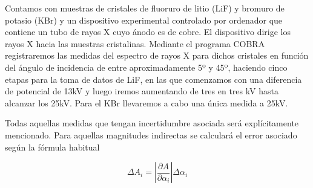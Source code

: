 Contamos con muestras de cristales de fluoruro de litio (LiF) y bromuro de potasio (KBr) y un dispositivo experimental controlado por ordenador que contiene un tubo de rayos X cuyo ánodo es de cobre. El dispositivo dirige los rayos X hacia las muestras cristalinas. Mediante el programa COBRA registraremos las medidas del espectro de rayos X para dichos cristales en función del ángulo de incidencia de entre aproximadamente 5º y 45º, haciendo cinco etapas para la toma de datos de LiF, en las que comenzamos con una diferencia de potencial de 13kV y luego iremos aumentando de tres en tres kV hasta alcanzar los 25kV. Para el KBr llevaremos a cabo una única medida a 25kV.

Todas aquellas medidas que tengan incertidumbre asociada será explícitamente mencionado. Para aquellas magnitudes indirectas se calculará el error asociado según la fórmula habitual

\begin{equation}
	\Delta{A_i} = |\frac{\partial A}{\partial \alpha_i}|\Delta \alpha_i
\end{equation}
